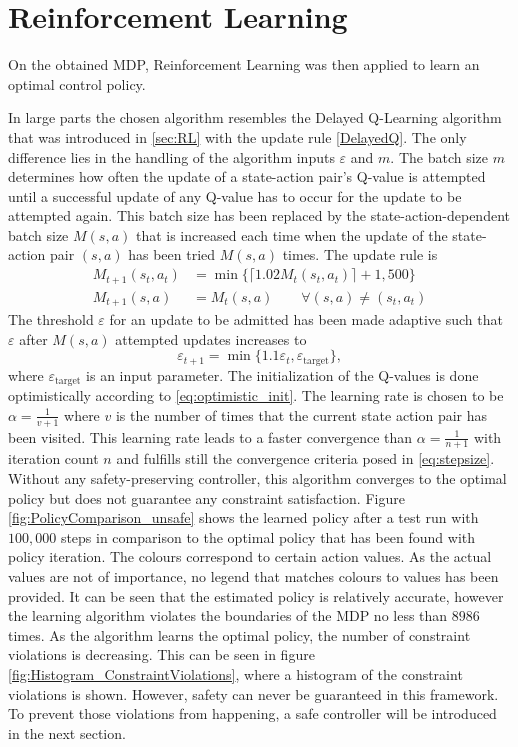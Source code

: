 \documentclass[../main.tex]{subfiles}
\begin{document}
\section{Reinforcement Learning}
On the obtained MDP, Reinforcement Learning was then applied to learn an optimal control policy.

In large parts the chosen algorithm resembles the Delayed Q-Learning algorithm that was introduced in \ref{sec:RL} with the update rule \eqref{DelayedQ}. The only difference lies in the handling of the algorithm inputs $\varepsilon$ and $m$. The batch size $m$ determines how often the update of a state-action pair's Q-value is attempted until a successful update of any Q-value has to occur for the update to be attempted again. This batch size has been replaced by the state-action-dependent batch size $M(s,a)$ that is increased each time when the update of the state-action pair $(s,a)$ has been tried $M(s,a)$ times. The update rule is 
\begin{align}
    M_{t+1}(s_t,a_t) &= \min\{\lceil1.02M_t(s_t,a_t)\rceil+1, 500\}\\
    M_{t+1}(s,a) &= M_t(s,a) \qquad \forall (s,a) \neq (s_t,a_t)
\end{align}
The threshold $\varepsilon$ for an update to be admitted has been made adaptive such that $\varepsilon$ after $M(s,a)$ attempted updates increases to 
\begin{equation}
    \varepsilon_{t+1} = \min\{1.1 \varepsilon_t, \varepsilon_{\text{target}}\}, 
\end{equation}
where $\varepsilon_{\text{target}}$ is an input parameter.
The initialization of the Q-values is done optimistically according to \eqref{eq:optimistic_init}. The learning rate is chosen to be $\alpha = \frac{1}{v+1}$ where $v$ is the number of times that the current state action pair has been visited. This learning rate leads to a faster convergence than $\alpha = \frac{1}{n+1}$ with iteration count $n$ and fulfills still the convergence criteria posed in \eqref{eq:stepsize}. Without any safety-preserving controller, this algorithm converges to the optimal policy but does not guarantee any constraint satisfaction. Figure \ref{fig:PolicyComparison_unsafe} shows the learned policy after a test run with $100,000$ steps in comparison to the optimal policy that has been found with policy iteration. The colours correspond to certain action values. As the actual values are not of importance, no legend that matches colours to values has been provided. It can be seen that the estimated policy is relatively accurate, however the learning algorithm violates the boundaries of the MDP no less than $8986$ times. As the algorithm learns the optimal policy, the number of constraint violations is decreasing. This can be seen in figure \ref{fig:Histogram_ConstraintViolations}, where a histogram of the constraint violations is shown. However, safety can never be guaranteed in this framework. To prevent those violations from happening, a safe controller will be introduced in the next section.
\end{document}

